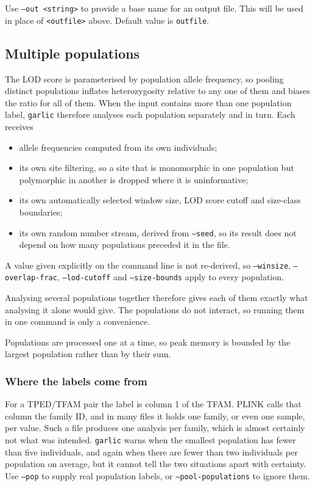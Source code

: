 \documentclass[12pt]{article}%
\begin{document}
Use {\tt --out <string>} to provide a base name for an output file.  This will be used in place of {\tt <outfile>} above.  Default value is {\tt outfile}.  

\subsection{Multiple populations}
\label{sec:multipop}

The LOD score is parameterised by population allele frequency, so pooling
distinct populations inflates heterozygosity relative to any one of them and
biases the ratio for all of them.  When the input contains more than one
population label, {\tt garlic} therefore analyses each population separately
and in turn.  Each receives

\begin{itemize}
\item allele frequencies computed from its own individuals;
\item its own site filtering, so a site that is monomorphic in one population
      but polymorphic in another is dropped where it is uninformative;
\item its own automatically selected window size, LOD score cutoff and
      size-class boundaries;
\item its own random number stream, derived from {\tt --seed}, so its result
      does not depend on how many populations preceded it in the file.
\end{itemize}

\noindent A value given explicitly on the command line is not re-derived, so
{\tt --winsize}, {\tt --overlap-frac}, {\tt --lod-cutoff} and
{\tt --size-bounds} apply to every population.

Analysing several populations together therefore gives each of them exactly
what analysing it alone would give.  The populations do not interact, so
running them in one command is only a convenience.

Populations are processed one at a time, so peak memory is bounded by the
largest population rather than by their sum.

\subsubsection{Where the labels come from}

For a TPED/TFAM pair the label is column 1 of the TFAM.  PLINK calls that
column the family ID, and in many files it holds one family, or even one
sample, per value.  Such a file produces one analysis per family, which is
almost certainly not what was intended.  {\tt garlic} warns when the smallest
population has fewer than five individuals, and again when there are fewer
than two individuals per population on average, but it cannot tell the two
situations apart with certainty.  Use {\tt --pop} to supply real population
labels, or {\tt --pool-populations} to ignore them.
\end{document}
